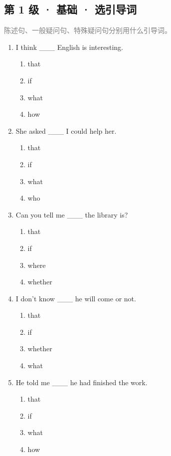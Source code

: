 \documentclass[11pt,a4paper]{ctexart}
\begin{document}
\subsection*{第 1 级 · 基础 · 选引导词}
\noindent\textcolor{gray}{陈述句、一般疑问句、特殊疑问句分别用什么引导词。}\par\smallskip
\begin{enumerate}[leftmargin=*,itemsep=4pt]
\item I think \_\_\_ English is interesting.
\begin{enumerate}[label=\Alph*.,leftmargin=2em,itemsep=1pt,topsep=2pt]
\item that
\item if
\item what
\item how
\end{enumerate}
\item She asked \_\_\_ I could help her.
\begin{enumerate}[label=\Alph*.,leftmargin=2em,itemsep=1pt,topsep=2pt]
\item that
\item if
\item what
\item who
\end{enumerate}
\item Can you tell me \_\_\_ the library is?
\begin{enumerate}[label=\Alph*.,leftmargin=2em,itemsep=1pt,topsep=2pt]
\item that
\item if
\item where
\item whether
\end{enumerate}
\item I don't know \_\_\_ he will come or not.
\begin{enumerate}[label=\Alph*.,leftmargin=2em,itemsep=1pt,topsep=2pt]
\item that
\item if
\item whether
\item what
\end{enumerate}
\item He told me \_\_\_ he had finished the work.
\begin{enumerate}[label=\Alph*.,leftmargin=2em,itemsep=1pt,topsep=2pt]
\item that
\item if
\item what
\item how

\end{enumerate}
\end{enumerate}
\end{document}
